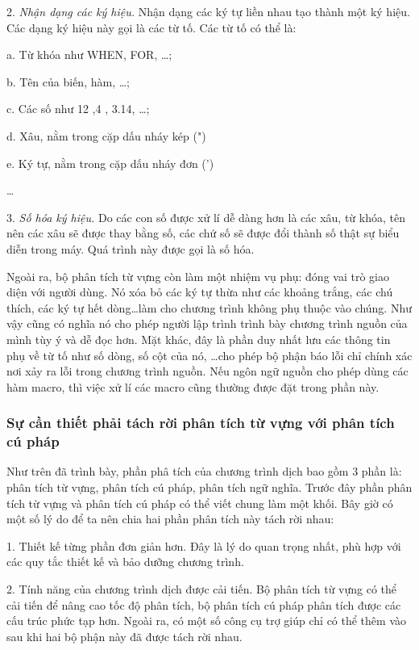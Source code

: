 2. {\itshape Nhận dạng các ký hiệu.} Nhận dạng các ký tự liền nhau tạo thành một ký hiệu. Các dạng ký hiệu này gọi là các từ tố. Các từ tố có thể là:

a. Từ khóa như WHEN, FOR, \dots;

b. Tên của biến, hàm, \dots;

c. Các số như 12 ,4 , 3.14, \dots;

d. Xâu, nằm trong cặp dấu nháy kép (")

e. Ký tự, nằm trong cặp dấu nháy đơn (')

\dots

3. {\itshape Số hóa ký hiệu.} Do các con số được xử lí dễ dàng hơn là các xâu, từ khóa, tên nên các xâu sẽ được thay bằng số, các chứ số sẽ được đổi thành số thật sự biểu diễn trong máy. Quá trình này được gọi là số hóa.

Ngoài ra, bộ phân tích từ vựng còn làm một nhiệm vụ phụ: đóng vai trò giao diện với người dùng. Nó xóa bỏ các ký tự thừa như các khoảng trắng, các chú thích, các ký tự hết dòng\dots\space làm cho chương trình không phụ thuộc vào chúng. Như vậy cũng có nghĩa nó cho phép người lập trình trình bày chương trình nguồn của mình tùy ý và dễ đọc hơn. Mặt khác, đây là phần duy nhất lưu các thông tin phụ về từ tố như số dòng, số cột của nó, \dots\space cho phép bộ phận báo lỗi chỉ chính xác nơi xảy ra lỗi trong chương trình nguồn. Nếu ngôn ngữ nguồn cho phép dùng các hàm macro, thì việc xử lí các macro cũng thường được đặt trong phần này.

\subsubsection{Sự cần thiết phải tách rời phân tích từ vựng với phân tích cú pháp}
Như trên đã trình bày, phần phâ tích của chương trình dịch bao gồm 3 phần là: phân tích từ vựng, phân tích cú pháp, phân tích ngữ nghĩa. Trước đây phần phân tích từ vựng và phân tích cú pháp có thể viết chung làm một khối. Bây giờ có một số lý do để ta nên chia hai phần phân tích này tách rời nhau:

1. Thiết kế từng phần đơn giản hơn. Đây là lý do quan trọng nhất, phù hợp với các quy tắc thiết kế và bảo dưỡng chương trình.

2. Tính năng của chương trình dịch được cải tiến. Bộ phân tích từ vựng có thể cải tiến để nâng cao tốc độ phân tích, bộ phân tích cú pháp phân tích được các cấu trúc phức tạp hơn. Ngoài ra, có một số công cụ trợ giúp chỉ có thể thêm vào sau khi hai bộ phận này đã được tách rời nhau.

